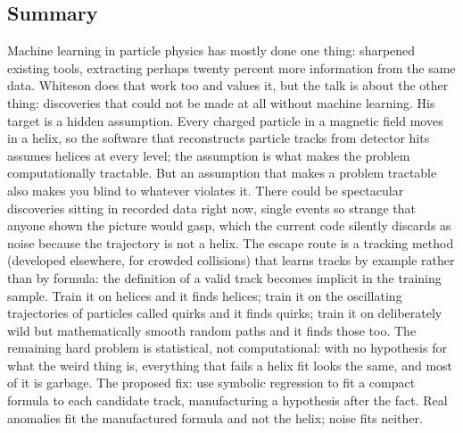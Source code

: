 \documentclass[11pt]{article}
\begin{document}
\subsection*{Summary}
Machine learning in particle physics has mostly done one thing: sharpened existing tools, extracting perhaps twenty percent more information from the same data. Whiteson does that work too and values it, but the talk is about the other thing: discoveries that could not be made at all without machine learning. His target is a hidden assumption. Every charged particle in a magnetic field moves in a helix, so the software that reconstructs particle tracks from detector hits assumes helices at every level; the assumption is what makes the problem computationally tractable. But an assumption that makes a problem tractable also makes you blind to whatever violates it. There could be spectacular discoveries sitting in recorded data right now, single events so strange that anyone shown the picture would gasp, which the current code silently discards as noise because the trajectory is not a helix. The escape route is a tracking method (developed elsewhere, for crowded collisions) that learns tracks by example rather than by formula: the definition of a valid track becomes implicit in the training sample. Train it on helices and it finds helices; train it on the oscillating trajectories of particles called quirks and it finds quirks; train it on deliberately wild but mathematically smooth random paths and it finds those too. The remaining hard problem is statistical, not computational: with no hypothesis for what the weird thing is, everything that fails a helix fit looks the same, and most of it is garbage. The proposed fix: use symbolic regression to fit a compact formula to each candidate track, manufacturing a hypothesis after the fact. Real anomalies fit the manufactured formula and not the helix; noise fits neither.
\end{document}
